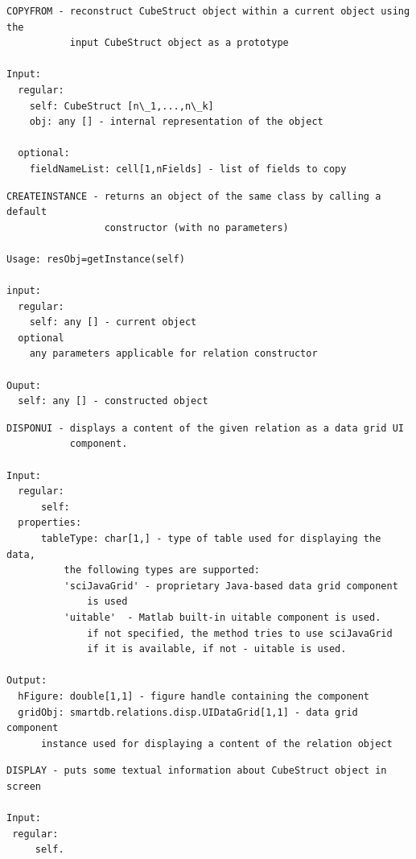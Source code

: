 \documentclass[letterpaper,10pt,english]{sphinxmanual}
\begin{document}
\begin{Verbatim}[commandchars=\\\{\}]
COPYFROM - reconstruct CubeStruct object within a current object using the
           input CubeStruct object as a prototype

Input:
  regular:
    self: CubeStruct [n\_1,...,n\_k]
    obj: any [] - internal representation of the object

  optional:
    fieldNameList: cell[1,nFields] - list of fields to copy
\end{Verbatim}
\label{chap_func:smartdb-relations-atypifiedstaticrelation-createinstance}
\begin{Verbatim}[commandchars=\\\{\}]
CREATEINSTANCE - returns an object of the same class by calling a default
                 constructor (with no parameters)

Usage: resObj=getInstance(self)

input:
  regular:
    self: any [] - current object
  optional
    any parameters applicable for relation constructor

Ouput:
  self: any [] - constructed object
\end{Verbatim}
\label{chap_func:smartdb-relations-atypifiedstaticrelation-disponui}
\begin{Verbatim}[commandchars=\\\{\}]
DISPONUI - displays a content of the given relation as a data grid UI
           component.

Input:
  regular:
      self:
  properties:
      tableType: char[1,] - type of table used for displaying the data,
          the following types are supported:
          'sciJavaGrid' - proprietary Java-based data grid component
              is used
          'uitable'  - Matlab built-in uitable component is used.
              if not specified, the method tries to use sciJavaGrid
              if it is available, if not - uitable is used.

Output:
  hFigure: double[1,1] - figure handle containing the component
  gridObj: smartdb.relations.disp.UIDataGrid[1,1] - data grid component
      instance used for displaying a content of the relation object
\end{Verbatim}
\label{chap_func:smartdb-relations-atypifiedstaticrelation-display}
\begin{Verbatim}[commandchars=\\\{\}]
DISPLAY - puts some textual information about CubeStruct object in screen

Input:
 regular:
     self.
\end{Verbatim}
\end{document}
